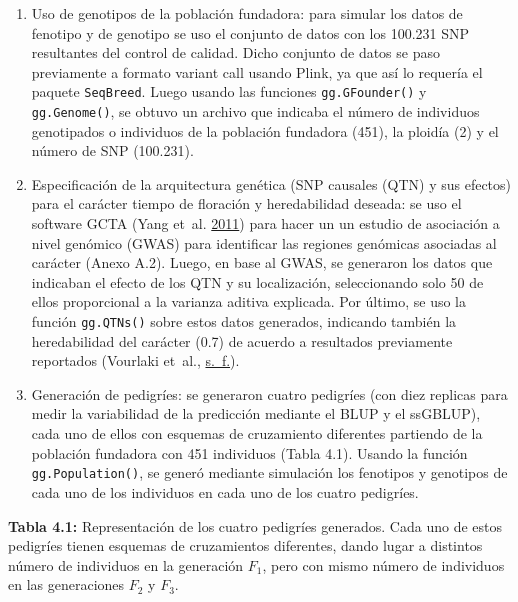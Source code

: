 \documentclass[11pt,spanish,a4paper,oneside,]{book} %
\begin{document}
\begin{enumerate}
\def\labelenumi{\arabic{enumi}.}
\item
  Uso de genotipos de la población fundadora: para simular los datos de fenotipo y de genotipo se uso el conjunto de datos con los 100.231 SNP resultantes del control de calidad. Dicho conjunto de datos se paso previamente a formato variant call usando Plink, ya que así lo requería el paquete \texttt{SeqBreed}. Luego usando las funciones \texttt{gg.GFounder()} y \texttt{gg.Genome()}, se obtuvo un archivo que indicaba el número de individuos genotipados o individuos de la población fundadora (451), la ploidía (2) y el número de SNP (100.231).
\item
  Especificación de la arquitectura genética (SNP causales (QTN) y sus efectos) para el carácter tiempo de floración y heredabilidad deseada: se uso el software GCTA (Yang et~al. \protect\hyperlink{ref-cite:54}{2011}) para hacer un un estudio de asociación a nivel genómico (GWAS) para identificar las regiones genómicas asociadas al carácter (Anexo A.2). Luego, en base al GWAS, se generaron los datos que indicaban el efecto de los QTN y su localización, seleccionando solo 50 de ellos proporcional a la varianza aditiva explicada. Por último, se uso la función \texttt{gg.QTNs()} sobre estos datos generados, indicando también la heredabilidad del carácter (0.7) de acuerdo a resultados previamente reportados (Vourlaki et~al., \protect\hyperlink{ref-cite:26}{s.~f.}).
\item
  Generación de pedigríes: se generaron cuatro pedigríes (con diez replicas para medir la variabilidad de la predicción mediante el BLUP y el ssGBLUP), cada uno de ellos con esquemas de cruzamiento diferentes partiendo de la población fundadora con 451 individuos (Tabla 4.1). Usando la función \texttt{gg.Population()}, se generó mediante simulación los fenotipos y genotipos de cada uno de los individuos en cada uno de los cuatro pedigríes.
\end{enumerate}

\begin{center}
\textbf{Tabla 4.1:} Representación de los cuatro pedigríes generados. Cada uno de estos pedigríes tienen esquemas de cruzamientos diferentes, dando lugar a distintos número de individuos en la generación \(F_{1}\), pero con mismo número de individuos en las generaciones \(F_{2}\) y \(F_{3}\).

\end{center}
\end{document}
